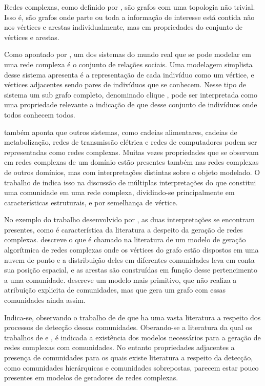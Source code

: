 \documentclass[notes.tex]{subfiles}
\begin{document}
Redes complexas, como definido por , são grafos com uma topologia não trivial.
Isso é, são grafos onde parte ou toda a informação de interesse está contida não nos vértices e arestas individualmente, mas em propriedades do conjunto de vértices e arestas.

Como apontado por , um dos sistemas do mundo real que se pode modelar em uma rede complexa é o conjunto de relações sociais.
Uma modelagem simplista desse sistema apresenta é a representação de cada indivíduo como um vértice, e vértices adjacentes sendo pares de indivíduos que se conhecem.
Nesse tipo de sistema um sub grafo completo, denominado clique \cite{fortunato2010community}, pode ser interpretada como uma propriedade relevante a indicação de que desse conjunto de indivíduos onde todos conhecem todos.

 também aponta que outros sistemas, como cadeias alimentares, cadeias de metabolização, redes de transmissão elétrica e redes de computadores podem ser representadas como redes complexas.
Muitas vezes propriedades que se observam em redes complexas de um domínio estão presentes também nas redes complexas de outros domínios, mas com interpretações distintas sobre o objeto modelado.
O trabalho de  indica isso na discussão de múltiplas interpretações do que constitui uma comunidade em uma rede complexa, dividindo-se principalmente em características estruturais, e por semelhança de vértice.

No exemplo do trabalho desenvolvido por , as duas interpretações se encontram presentes, como é característica da literatura a despeito da geração de redes complexas.
 descreve o que é chamado na literatura de um modelo de geração algorítmica de redes complexas onde os vértices do grafo estão dispostos em uma nuvem de ponto e a distribuição deles em diferentes comunidades leva em conta sua posição espacial, e as arestas são construídas em função desse pertencimento a uma comunidade.
 descreve um modelo mais primitivo, que não realiza a atribuição explicita de comunidades, mas que gera um grafo com essas comunidades ainda assim. 

Indica-se, observando o trabalho de  de que ha uma vasta literatura a respeito dos processos de detecção dessas comunidades.
Oberando-se a literatura da qual os trabalhos de  e , é indicada a existência dos modelos necessários para a geração de redes complexas com comunidades.
No entanto propriedades adjacentes a presença de comunidades para os quais existe literatura a respeito da detecção, como comunidades hierárquicas e comunidades sobrepostas, parecem estar pouco presentes em modelos de geradores de redes complexas.
\end{document}
